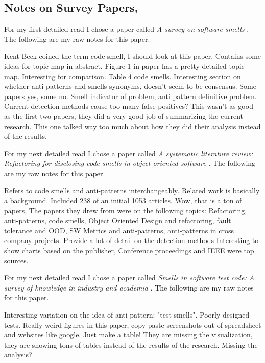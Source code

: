 \documentclass[conference]{IEEEtran}
\begin{document}
\subsection{Notes on Survey Papers, }
For my first detailed read I chose a paper called  \textit{A survey on software smells} \cite{sharma_survey_2018}.
The following are my raw notes for this paper.

Kent Beck coined the term code smell, I should look at this paper.
Contains some ideas for topic map in abstract.
Figure 1 in paper has a pretty detailed topic map.
Interesting for comparison.
Table 4 code smells.
Interesting section on whether anti-patterns and smells synonyms, doesn't seem to be consensus. Some papers yes, some no.
Smell indicator of problem, anti pattern definitive problem.
Current detection methods cause too many false positives?
This wasn't as good as the first two papers, they did a very good job of summarizing the current research. This one talked way too much about how they did their analysis instead of the results.


For my next detailed read I chose a paper called  \textit{A systematic literature review: Refactoring for disclosing code smells in object oriented software} \cite{singh_systematic_2018}. 
The following are my raw notes for this paper.

Refers to code smells and anti-patterns interchangeably.
Related work is basically a background.
Included 238 of an initial 1053 articles.
Wow, that is a ton of papers.
The papers they drew from were on the following topics: Refactoring, anti-patterns, code smells, Object Oriented Design and refactoring, fault tolerance and OOD, SW Metrics and anti-patterns, anti-patterns in cross company projects.
Provide a lot of detail on the detection methods
Interesting to show charts based on the publisher, Conference proceedings and IEEE were top sources.


For my next detailed read I chose a paper called  \textit{Smells in software test code: A survey of knowledge in industry and academia} \cite{garousi_smells_2018}. 
The following are my raw notes for this paper.

Interesting variation on the idea of anti pattern: "test smells".
Poorly designed tests.
Really weird figures in this paper, copy paste screenshots out of spreadsheet and websites like google.
Just make a table!
They are missing the visualization, they are showing tons of tables instead of the results of the research.
Missing the analysis?
\end{document}
